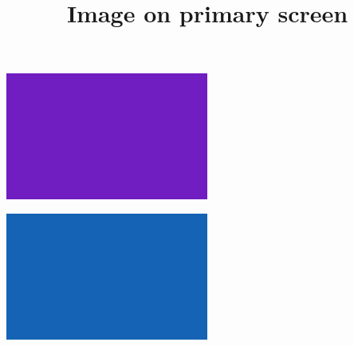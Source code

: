 \documentclass[aspectratio=169]{beamer}
\title{Image on primary screen}
\begin{document}
\begingroup
	\begin{frame}
		\begin{center}
			\includegraphics[width=0.5\textwidth]{jpeg-image}
		\end{center}
	\end{frame}
	\begin{frame}
		\begin{center}
			\includegraphics[width=0.5\textwidth]{png-image}
		\end{center}
	\end{frame}
\endgroup
\end{document}
